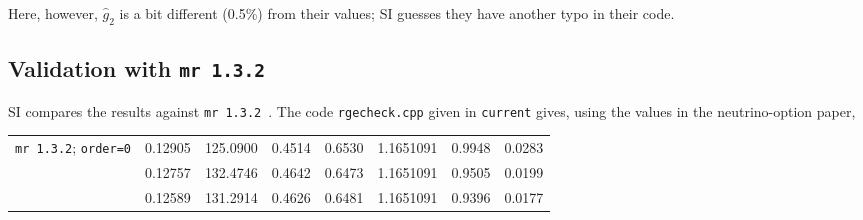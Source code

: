 \documentclass[a4paper,11pt]{scrartcl}
\numberwithin{equation}{section}
\newcommand{\rev}[1]{{\color{magenta}\texttt{#1}}}
\begin{document}
Here, however, $\hat g_2$ is a bit different (0.5\%) from their values; SI guesses they have another typo in their code.

\subsection{Validation with \texttt{mr~1.3.2}}
SI compares the results against \texttt{mr~1.3.2}~\cite{Kniehl:2016enc}. The code \texttt{rgecheck.cpp} given in \rev{current} gives, using the values in the neutrino-option paper,

\begin{table}[h]\centering\small
 \begin{tabular}{c|ccccccc}
 \texttt{mr 1.3.2}; \texttt{order=0}
 & 0.12905 & 125.0900 & 0.4514 & 0.6530 & 1.1651091 & 0.9948 & 0.0283\\
 & 0.12757 & 132.4746 & 0.4642 & 0.6473 & 1.1651091 & 0.9505 & 0.0199\\
 & 0.12589 & 131.2914 & 0.4626 & 0.6481 & 1.1651091 & 0.9396 & 0.0177\\
 \end{tabular}
\end{table}


\end{document}
